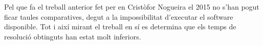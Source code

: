 \documentclass[11pt,a4paper,oneside]{article}
\begin{document}
  Pel que fa el treball anterior fet per en Cristòfor Nogueira el 2015 no s'han pogut ficar taules comparatives, 
  degut a la impossibilitat d'executar el software disponible. 
  Tot i així mirant el treball en sí es determina que els temps de resolució obtinguts han estat molt inferiors. 

  
  
\end{document}

